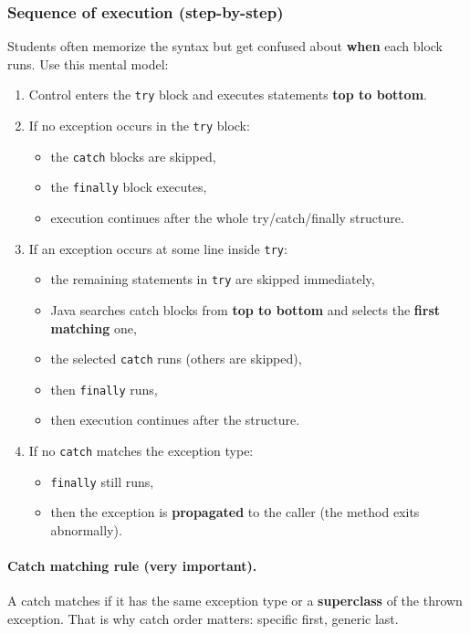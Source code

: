 \documentclass[11pt]{article}
\begin{document}
\subsubsection*{Sequence of execution (step-by-step)}
Students often memorize the syntax but get confused about \textbf{when} each block runs.
Use this mental model:
\begin{enumerate}
  \item Control enters the \texttt{try} block and executes statements \textbf{top to bottom}.
  \item If no exception occurs in the \texttt{try} block:
    \begin{itemize}
      \item the \texttt{catch} blocks are skipped,
      \item the \texttt{finally} block executes,
      \item execution continues after the whole try/catch/finally structure.
    \end{itemize}
  \item If an exception occurs at some line inside \texttt{try}:
    \begin{itemize}
      \item the remaining statements in \texttt{try} are skipped immediately,
      \item Java searches catch blocks from \textbf{top to bottom} and selects the \textbf{first matching} one,
      \item the selected \texttt{catch} runs (others are skipped),
      \item then \texttt{finally} runs,
      \item then execution continues after the structure.
    \end{itemize}
  \item If no \texttt{catch} matches the exception type:
    \begin{itemize}
      \item \texttt{finally} still runs,
      \item then the exception is \textbf{propagated} to the caller (the method exits abnormally).
    \end{itemize}
\end{enumerate}

\paragraph{Catch matching rule (very important).}
A catch matches if it has the same exception type or a \textbf{superclass} of the thrown exception.
That is why catch order matters: specific first, generic last.
\end{document}

